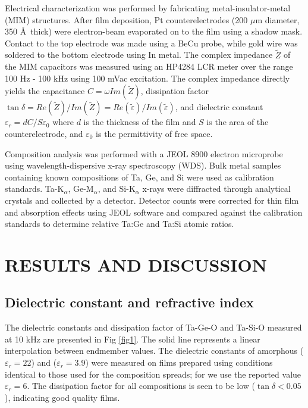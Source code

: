 \documentclass[aip,jap,numerical,citeautoscript,preprint]{revtex4-1}
\begin{document}
Electrical characterization was performed by fabricating metal-insulator-metal (MIM) structures. After film deposition, Pt counterelectrodes (200 $\mu$m diameter, 350 \AA\ thick) were electron-beam evaporated on to the film using a shadow mask. Contact to the top electrode was made using a BeCu probe, while gold wire was soldered to the bottom electrode using In metal. The complex impedance $\tilde{Z}$ of the MIM capacitors was measured using an HP4284 LCR meter over the range 100 Hz - 100 kHz using 100 mVac excitation. The complex impedance directly yields the capacitance $C=\omega Im(\tilde{Z})$, dissipation factor $\tan\delta = Re(\tilde{Z})/Im(\tilde{Z}) = Re(\tilde{\varepsilon})/Im(\tilde{\varepsilon})$, and dielectric constant $\varepsilon_{r} = d C/S\varepsilon_0$ where $d$ is the thickness of the film and $S$ is the area of the counterelectrode, and $\varepsilon_0$ is the permittivity of free space.

Composition analysis was performed with a JEOL 8900 electron microprobe using wavelength-dispersive x-ray spectroscopy (WDS). Bulk metal samples containing known compositions of Ta, Ge, and Si were used as calibration standards. Ta-K$_{\alpha}$, Ge-M$_{\alpha}$, and  Si-K$_{\alpha}$ x-rays were diffracted through analytical crystals and collected by a detector. Detector counts were corrected for thin film and absorption effects using JEOL software and compared against the calibration standards to determine relative Ta:Ge and Ta:Si atomic ratios. 

\section{RESULTS AND DISCUSSION} 
\subsection{Dielectric constant and refractive index}
The dielectric constants and dissipation factor of Ta-Ge-O and Ta-Si-O measured at 10 kHz are presented in Fig \ref{fig1}. 
The solid line represents a linear interpolation between endmember values. The dielectric constants of amorphous  ($\varepsilon_{r} =22$)\cite{Barron2009} and  ($\varepsilon_{r}=3.9$) were measured on films prepared using conditions identical to those used for the composition spreads; for  we use the reported\cite{Caperaa1989} value $\varepsilon_{r}=6$. The dissipation factor for all compositions is seen to be low ($\tan\delta < 0.05$), indicating good quality films. 
\end{document}
